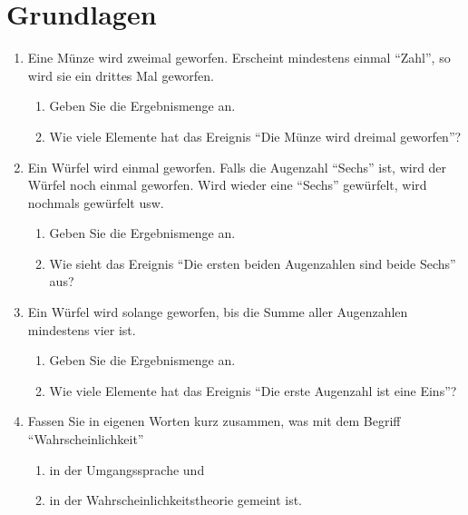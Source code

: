 \section[Grundlagen]{Grundlagen}

\begin{enumerate}
\item Eine M\"{u}nze wird zweimal geworfen. Erscheint mindestens einmal
"`Zahl"', so wird sie ein drittes Mal geworfen.
\begin{enumerate}
\item Geben Sie die Ergebnismenge an.
\item Wie viele Elemente hat das Ereignis "`Die M\"{u}nze wird dreimal
geworfen"'?
\end{enumerate}

\item Ein W\"{u}rfel wird einmal geworfen. Falls die Augenzahl
"`Sechs"' ist, wird der W\"{u}rfel noch einmal geworfen.
Wird wieder eine "`Sechs"' gew\"{u}rfelt, wird nochmals gew\"{u}rfelt usw.
\begin{enumerate}
\item Geben Sie die Ergebnismenge an.
\item Wie sieht das Ereignis "`Die ersten beiden Augenzahlen sind beide
Sechs"' aus?
\end{enumerate}

\item Ein W\"{u}rfel wird solange geworfen, bis die Summe aller Augenzahlen
mindestens vier ist.
\begin{enumerate}
\item Geben Sie die Ergebnismenge an.
\item Wie viele Elemente hat das Ereignis "`Die erste Augenzahl ist eine Eins"'?
\end{enumerate}

\item Fassen Sie in eigenen Worten kurz zusammen, was mit dem Begriff
"`Wahrscheinlichkeit"' 
\begin{enumerate}
\item in der Umgangssprache und
\item in der Wahrscheinlichkeitstheorie gemeint ist.
\end{enumerate}
\end{enumerate}
